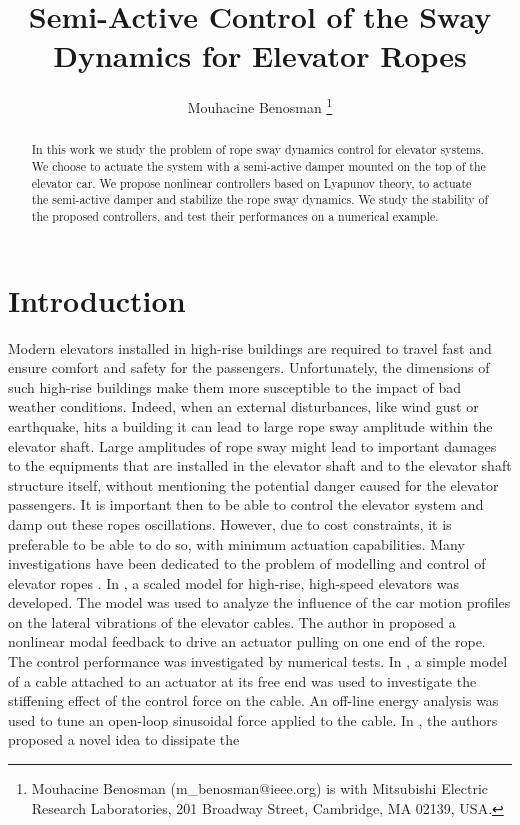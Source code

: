 \documentclass[letterpaper, 11 pt, conference]{ieeeconf}
\title{\bf Semi-Active Control of the Sway Dynamics for Elevator Ropes}
\author{ Mouhacine Benosman
\thanks{Mouhacine Benosman (m{\_}benosman@ieee.org) is with Mitsubishi Electric Research Laboratories, 201 Broadway Street, Cambridge, MA 02139, USA.}
 }
\date{}
\begin{document}
\maketitle\thispagestyle{empty}
\begin{abstract}
In this work we study the problem of rope sway dynamics control
for elevator systems. We choose to actuate the system with a
semi-active damper mounted on the top of the elevator car. We
propose nonlinear controllers based on Lyapunov theory, to actuate
the semi-active damper and stabilize the rope sway dynamics. We
study the stability of the proposed controllers, and test their
performances on a numerical example.
\end{abstract}
\section{Introduction}
Modern elevators installed in high-rise buildings are required to
travel fast and ensure comfort and safety for the passengers.
Unfortunately, the dimensions of such high-rise buildings make
them more susceptible to the impact of bad weather conditions.
Indeed, when an external disturbances, like wind gust or
earthquake, hits a building it can lead to large rope sway
amplitude within the elevator shaft. Large amplitudes of rope sway
might lead to important damages to the equipments that are
installed in the elevator shaft and to the
 elevator shaft structure itself, without mentioning the
 potential danger caused for the elevator passengers. It is important  then to be able to control the elevator system and damp out these
 ropes oscillations. However,
 due to cost constraints, it is preferable to be able to do so,
 with minimum actuation capabilities. Many investigations have been
 dedicated to the problem of modelling and control of elevator ropes
 \cite{K011,KIT09,ZX03,ZT03,ZC06,FWP93,B14}. In \cite{ZT03}, a scaled model for
 high-rise, high-speed elevators was developed. The model was used
 to analyze the influence of the car motion profiles on the
 lateral vibrations of the elevator cables. The author in \cite{K011} proposed a nonlinear modal
 feedback to drive an actuator pulling on one end of the rope.
 The control performance was investigated by numerical tests. In \cite{FWP93},
 a simple model of a cable attached to an actuator at its free
 end was used to investigate the stiffening effect of the control
 force on the cable. An off-line energy analysis was used to tune an open-loop sinusoidal force
 applied to the cable. In \cite{ZC06}, the authors proposed a novel idea to dissipate the
\end{document}
